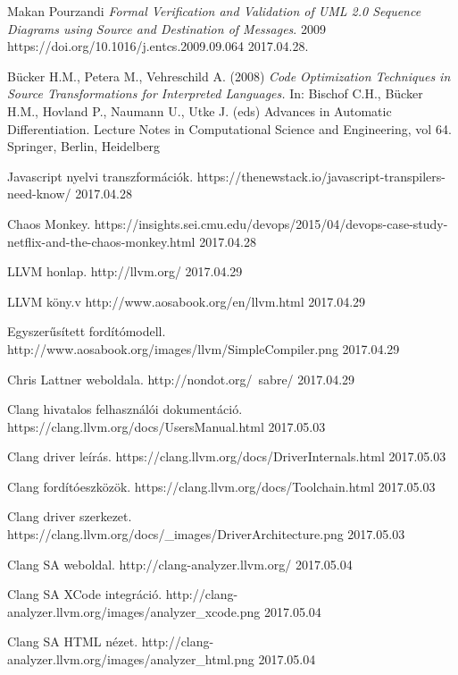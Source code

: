 \documentclass[a4paper,12pt]{report}
\begin{document}
\begin{thebibliography}{xx}

 Makan Pourzandi {\em Formal Verification and Validation of UML
2.0 Sequence Diagrams using Source and
Destination of Messages}.  2009 https://doi.org/10.1016/j.entcs.2009.09.064 2017.04.28.

 Bücker H.M., Petera M., Vehreschild A. (2008) {\em Code Optimization Techniques in Source Transformations for Interpreted Languages.} In: Bischof C.H., Bücker H.M., Hovland P., Naumann U., Utke J. (eds) Advances in Automatic Differentiation. Lecture Notes in Computational Science and Engineering, vol 64. Springer, Berlin, Heidelberg

 Javascript nyelvi transzformációk. https://thenewstack.io/javascript-transpilers-need-know/ 2017.04.28

 Chaos Monkey. https://insights.sei.cmu.edu/devops/2015/04/devops-case-study-netflix-and-the-chaos-monkey.html 2017.04.28

 LLVM honlap. http://llvm.org/ 2017.04.29

 LLVM köny.v http://www.aosabook.org/en/llvm.html 2017.04.29

 Egyszerűsített fordítómodell. http://www.aosabook.org/images/llvm/SimpleCompiler.png 2017.04.29

 Chris Lattner weboldala. http://nondot.org/~sabre/ 2017.04.29

 Clang hivatalos felhasználói dokumentáció. https://clang.llvm.org/docs/UsersManual.html 2017.05.03

 Clang driver leírás. https://clang.llvm.org/docs/DriverInternals.html 2017.05.03

 Clang fordítóeszközök. https://clang.llvm.org/docs/Toolchain.html 2017.05.03

 Clang driver szerkezet. https://clang.llvm.org/docs/\_images/DriverArchitecture.png 2017.05.03

 Clang SA weboldal. http://clang-analyzer.llvm.org/ 2017.05.04

 Clang SA XCode integráció. http://clang-analyzer.llvm.org/images/analyzer\_xcode.png 2017.05.04

 Clang SA HTML nézet. http://clang-analyzer.llvm.org/images/analyzer\_html.png 2017.05.04


\end{thebibliography}
\end{document}
